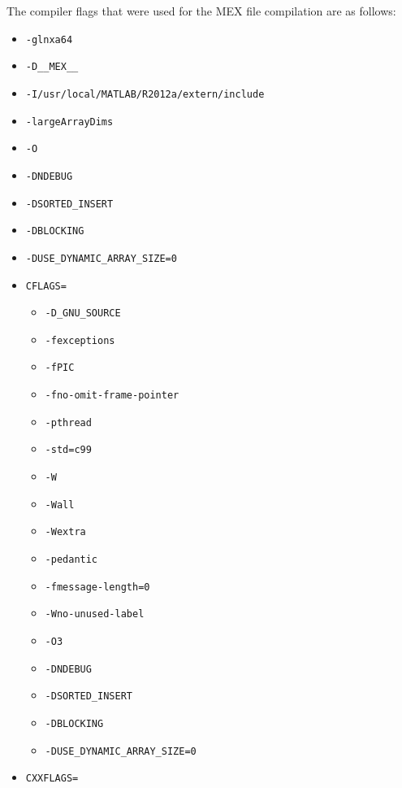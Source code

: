 The compiler flags that were used for the  MEX file compilation
are as follows:
\begin{itemize}[noitemsep]
    \item \lstinline|-glnxa64|
    \item \lstinline|-D__MEX__|
    \item \lstinline|-I/usr/local/MATLAB/R2012a/extern/include|
    \item \lstinline|-largeArrayDims|
    \item \lstinline|-O|
    \item \lstinline|-DNDEBUG|
    \item \lstinline|-DSORTED_INSERT|
    \item \lstinline|-DBLOCKING|
    \item \lstinline|-DUSE_DYNAMIC_ARRAY_SIZE=0|
    \item \lstinline|CFLAGS=|
        \begin{itemize}[noitemsep]
            \item \lstinline|-D_GNU_SOURCE|
            \item \lstinline|-fexceptions|
            \item \lstinline|-fPIC|
            \item \lstinline|-fno-omit-frame-pointer|
            \item \lstinline|-pthread|
            \item \lstinline|-std=c99|
            \item \lstinline|-W|
            \item \lstinline|-Wall|
            \item \lstinline|-Wextra|
            \item \lstinline|-pedantic|
            \item \lstinline|-fmessage-length=0|
            \item \lstinline|-Wno-unused-label|
            \item \lstinline|-O3|
            \item \lstinline|-DNDEBUG|
            \item \lstinline|-DSORTED_INSERT|
            \item \lstinline|-DBLOCKING|
            \item \lstinline|-DUSE_DYNAMIC_ARRAY_SIZE=0|
        \end{itemize}
    \item \lstinline|CXXFLAGS=|
        \begin{itemize}[noitemsep]

\end{itemize}
\end{itemize}
